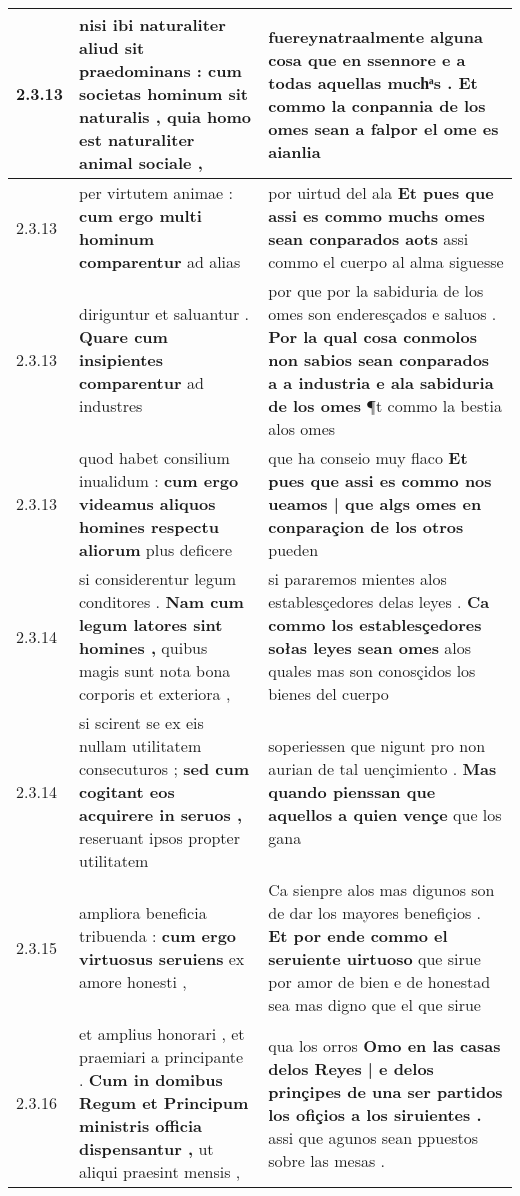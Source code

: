 \begin{tabular}{|p{1cm}|p{6.5cm}|p{6.5cm}|}
2.3.13 & nisi ibi naturaliter aliud sit praedominans : \textbf{ cum societas hominum sit naturalis , } quia homo est naturaliter animal sociale , & fuereynatraalmente alguna cosa \textbf{ que en ssennore e a todas aquellas muchͣs . } Et commo la conpannia de los omes sean a falpor el ome es aianlia \\\hline
2.3.13 & per virtutem animae : \textbf{ cum ergo multi hominum comparentur } ad alias & por uirtud del ala \textbf{ Et pues que assi es commo muchs omes sean conparados aots } assi commo el cuerpo al alma siguesse \\\hline
2.3.13 & diriguntur et saluantur . \textbf{ Quare cum insipientes comparentur } ad industres & por que por la sabiduria de los omes son enderesçados e saluos . \textbf{ Por la qual cosa conmolos non sabios sean conparados a a industria e ala sabiduria de los omes } ¶t commo la bestia alos omes \\\hline
2.3.13 & quod habet consilium inualidum : \textbf{ cum ergo videamus aliquos homines respectu aliorum } plus deficere & que ha conseio muy flaco \textbf{ Et pues que assi es commo nos ueamos | que algs omes en conparaçion de los otros } pueden \\\hline
2.3.14 & si considerentur legum conditores . \textbf{ Nam cum legum latores sint homines , } quibus magis sunt nota bona corporis et exteriora , & si pararemos mientes alos establesçedores delas leyes . \textbf{ Ca commo los establesçedores sołas leyes sean omes } alos quales mas son conosçidos los bienes del cuerpo \\\hline
2.3.14 & si scirent se ex eis nullam utilitatem consecuturos ; \textbf{ sed cum cogitant eos acquirere in seruos , } reseruant ipsos propter utilitatem & soperiessen que nigunt pro non aurian de tal uençimiento . \textbf{ Mas quando pienssan que aquellos a quien vençe } que los gana \\\hline
2.3.15 & ampliora beneficia tribuenda : \textbf{ cum ergo virtuosus seruiens } ex amore honesti , & Ca sienpre alos mas digunos son de dar los mayores benefiçios . \textbf{ Et por ende commo el seruiente uirtuoso } que sirue por amor de bien e de honestad sea mas digno que el que sirue \\\hline
2.3.16 & et amplius honorari , et praemiari a principante . \textbf{ Cum in domibus Regum et Principum ministris officia dispensantur , } ut aliqui praesint mensis , & qua los orros \textbf{ Omo en las casas delos Reyes | e delos prinçipes de una ser partidos los ofiçios a los siruientes . } assi que agunos sean ppuestos sobre las mesas . \\\hline

\end{tabular}
